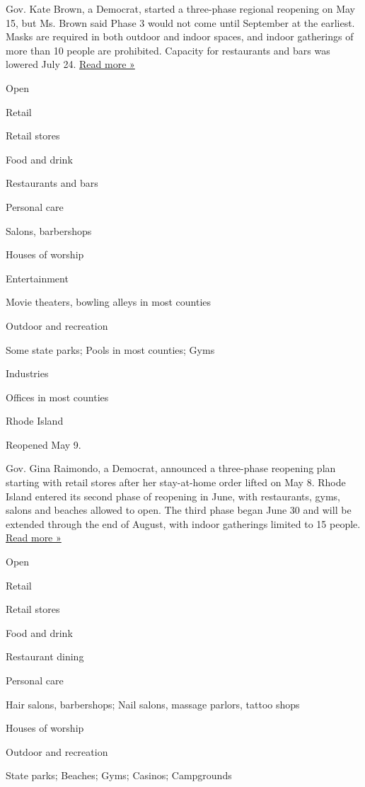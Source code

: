 Gov. Kate Brown, a Democrat, started a three-phase regional reopening on
May 15, but Ms. Brown said Phase 3 would not come until September at the
earliest. Masks are required in both outdoor and indoor spaces, and
indoor gatherings of more than 10 people are prohibited. Capacity for
restaurants and bars was lowered July 24.
\href{https://www.oregonlive.com/news/2020/07/oregon-gov-kate-brown-announces-new-mask-mandate-for-kids-earlier-bar-and-restaurant-closure-times.html}{Read
more »}

Open

Retail

Retail stores

Food and drink

Restaurants and bars

Personal care

Salons, barbershops

Houses of worship

Entertainment

Movie theaters, bowling alleys in most counties

Outdoor and recreation

Some state parks; Pools in most counties; Gyms

Industries

Offices in most counties

Rhode Island

Reopened May 9.

Gov. Gina Raimondo, a Democrat, announced a three-phase reopening plan
starting with retail stores after her stay-at-home order lifted on May
8. Rhode Island entered its second phase of reopening in June, with
restaurants, gyms, salons and beaches allowed to open. The third phase
began June 30 and will be extended through the end of August, with
indoor gatherings limited to 15 people.
\href{https://www.wpri.com/health/coronavirus/july-29-ri-coronavirus-update/}{Read
more »}

Open

Retail

Retail stores

Food and drink

Restaurant dining

Personal care

Hair salons, barbershops; Nail salons, massage parlors, tattoo shops

Houses of worship

Outdoor and recreation

State parks; Beaches; Gyms; Casinos; Campgrounds

